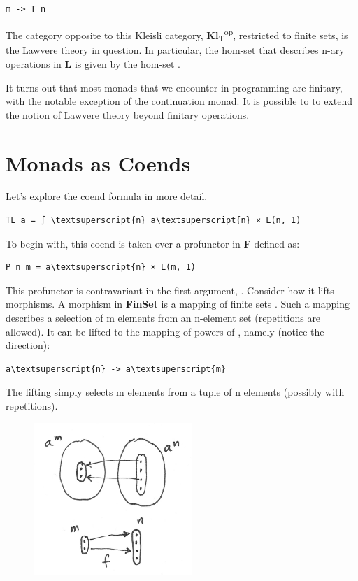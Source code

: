 \begin{Verbatim}[commandchars=\\\{\}]
m -> T n
\end{Verbatim}
The category opposite to this Kleisli category,
\textbf{Kl}\textsubscript{T}\textsuperscript{op}, restricted to finite
sets, is the Lawvere theory in question. In particular, the hom-set
 that describes n-ary operations in \textbf{L} is given
by the hom-set .

It turns out that most monads that we encounter in programming are
finitary, with the notable exception of the continuation monad. It is
possible to to extend the notion of Lawvere theory beyond finitary
operations.

\section{Monads as Coends}\label{monads-as-coends}

Let's explore the coend formula in more detail.

\begin{Verbatim}[commandchars=\\\{\}]
TL a = ∫ \textsuperscript{n} a\textsuperscript{n} × L(n, 1)
\end{Verbatim}
To begin with, this coend is taken over a profunctor  in
\textbf{F} defined as:

\begin{Verbatim}[commandchars=\\\{\}]
P n m = a\textsuperscript{n} × L(m, 1)
\end{Verbatim}
This profunctor is contravariant in the first argument, .
Consider how it lifts morphisms. A morphism in \textbf{FinSet} is a
mapping of finite sets . Such a
mapping describes a selection of m elements from an n-element set
(repetitions are allowed). It can be lifted to the mapping of powers of
, namely (notice the direction):

\begin{Verbatim}[commandchars=\\\{\}]
a\textsuperscript{n} -> a\textsuperscript{m}
\end{Verbatim}
The lifting simply selects m elements from a tuple of n elements
 (possibly with repetitions).

\begin{figure}[H]
\centering
\includegraphics[width=60mm]{images/liftpower.png}
\end{figure}

